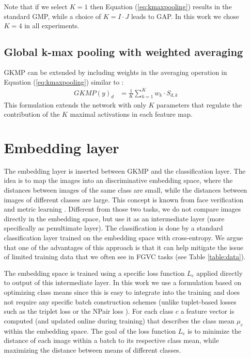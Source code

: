 \documentclass[10pt,twocolumn,letterpaper]{article}
\begin{document}
Note that if we select $K=1$ then Equation (\ref{eq:kmaxpooling}) results in the standard GMP, while a choice of $K=I\cdot J$ leads to GAP. In this work we chose $K=4$ in all experiments.

\subsection{Global k-max pooling with weighted averaging}
\label{section:gkmp_wavg}
GKMP can be extended by including weights in the averaging operation in Equation (\ref{eq:kmaxpooling}) similar to \cite{weng2013learning}:
\begin{align}
  \label{eq:kmaxpooling_wavg}
  GKMP(y)_d &= \frac{1}{K} \sum_{k=1}^K w_k \cdot S_{d,k}
\end{align}
This formulation extends the network with only $K$ parameters that regulate the contribution of the $K$ maximal activations in each feature map.


\section{Embedding layer}
\label{section:emb}


The embedding layer is inserted between GKMP and the classification layer. The idea is to map the images into an discriminative embedding space, where the distances between images of the same class are small, while the distances between images of different classes are large. This concept is known from face verification \cite{schroff2015facenet,wen2016discriminative,hanselmann2017deep} and metric learning \cite{rippel2015metric}. Different from those two tasks, we do not compare images directly in the embedding space, but use it as an intermediate layer (more specifically as penultimate layer). The classification is done by a standard classification layer trained on the embedding space with cross-entropy. We argue that one of the advantages of this approach is that it can help mitigate the issue of limited training data that we often see in FGVC tasks (see Table \ref{table:data}).

The embedding space is trained using a specific loss function $L_e$ applied directly to output of this intermediate layer. In this work we use a formulation based on optimizing class means \cite{wen2016discriminative,hanselmann2017deep} since this is easy to integrate into the training and does not require any specific batch construction schemes (unlike tuplet-based losses such as the triplet loss \cite{schroff2015facenet} or the NPair loss \cite{sohn2016improved}). For each class $c$ a feature vector is computed (and updated online during training) that describes the class mean $\mu_c$ within the embedding space. The goal of the loss function $L_e$ is to minimize the distance of each image within a batch to its respective class mean, while maximizing the distance between means of different classes. 
\end{document}
